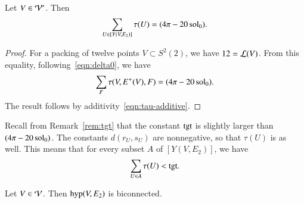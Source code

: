 \documentclass{llncs}
\def\op#1{{\hbox{#1}}}
\begin{document}
\begin{lemma} Let $V\in {\mathcal V}'$.  Then
\[
\sum_{U\in [Y(V,E_{2})]} \tau(U) = (4\pi - 20\operatorname{sol}_0).
\]
\end{lemma}

%
\begin{proof} For a packing of twelve points $V\subset S^2(2)$, we have
$12={\mathcal L}(V)$.   From this equality, following~\eqref{eqn:delta0}, we have
\[
  \sum_F \tau (V,E^+(V),F) = (4\pi - 20\operatorname{sol}_0). 
\]
The result follows by additivity~\eqref{eqn:tau-additive}.
\end{proof}

Recall from Remark~\ref{rem:tgt} that the constant $\op{tgt}$ is slightly
larger than $(4\pi-20\operatorname{sol}_0)$.  The constants $d(r_U,s_U)$ are nonnegative, so that
$\tau(U)$ is as well.  This means that for every subset
$A$ of $[Y(V,E_{2})]$, we have
\begin{equation}\label{eqn:subtgt}
\sum_{U\in A} \tau(U) < \op{tgt}.
\end{equation}



\begin{lemma}[biconnected]\label{lemma:biconnected}
  Let $V\in {\mathcal V}$.  Then $\op{hyp}(V,E_{2})$ is biconnected.
\end{lemma}
\end{document}
